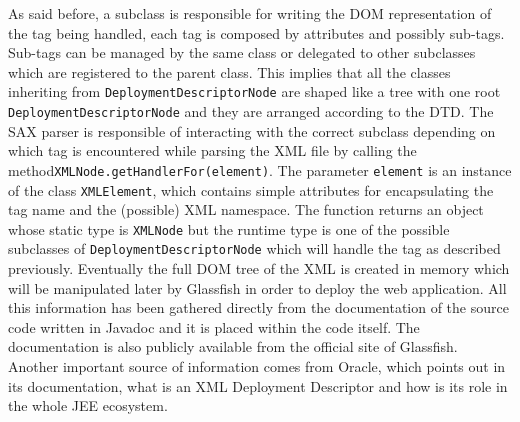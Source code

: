 As said before, a subclass is responsible for writing the DOM representation of the tag being handled, each tag is composed by attributes and possibly sub-tags. Sub-tags can be managed by the same class or delegated to other subclasses which are registered to the parent class. \newline This implies that all the classes inheriting from \texttt{DeploymentDescriptorNode} are shaped like a tree with one root \texttt{DeploymentDescriptorNode} and they are arranged according to the DTD. \newline The SAX parser is responsible of interacting with the correct subclass depending on which tag is encountered while parsing the XML file by calling the method\newline\texttt{XMLNode.getHandlerFor(element)}. The parameter \texttt{element} is an instance of the class \texttt{XMLElement}, which contains simple attributes for encapsulating the tag name and the (possible) XML namespace. The function returns an object whose static type is \texttt{XMLNode} but the runtime type is one of the possible subclasses of \newline \texttt{DeploymentDescriptorNode} which will handle the tag as described previously. \newline
Eventually the full DOM tree of the XML is created in memory which will be manipulated later by Glassfish in order to deploy the web application. \newline
All this information has been gathered directly from the documentation of the source code written in Javadoc and it is placed within the code itself. The documentation is also publicly available from the official site of Glassfish. Another important source of information comes from Oracle, which points out in its documentation, what is an XML Deployment Descriptor and how is its role in the whole JEE ecosystem.